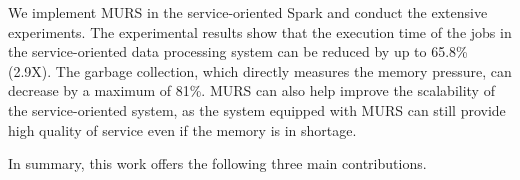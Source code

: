 

We implement MURS in the service-oriented Spark and conduct the extensive experiments. The experimental results show that the execution time of the jobs in the service-oriented data processing system can be reduced by up to 65.8\% (2.9X). The garbage collection, which directly measures the memory pressure, can decrease by a maximum of 81\%. MURS can also help improve the scalability of the service-oriented system, as the system equipped with MURS can still provide high quality of service even if the memory is in shortage. 

In summary, this work offers the following three main contributions.

